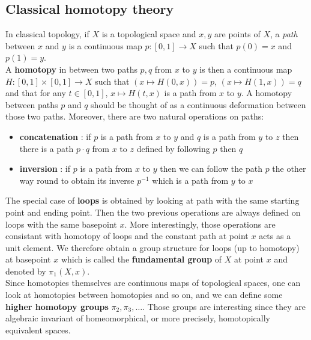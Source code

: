 \documentclass{report}
\begin{document}
\subsection{Classical homotopy theory}
In classical topology, if $X$ is a topological space and $x,y$ are points of $X$, a \textit{path} between $x$ and $y$ is a continuous map $p : [0,1] \rightarrow X$ such that $p(0)=x$ and $p(1)=y$.\\
A \textbf{homotopy} in between two paths $p,q$ from $x$ to $y$ is then a continuous map $H : [0,1] \times [0,1] \rightarrow X$ such that $(x \mapsto H(0,x) )= p$, $(x \mapsto H(1,x)) = q$ and that for any $t \in [0,1]$, $x\mapsto H(t,x)$ is a path from $x$ to $y$. A homotopy between paths $p$ and $q$ should be thought of as a continuous deformation between those two paths. Moreover, there are two natural operations on paths:
\begin{itemize}
    \item \textbf{concatenation} : if $p$ is a path from $x$ to $y$ and $q$ is a path from $y$ to $z$ then there is a path $p \cdot q$ from $x$ to $z$ defined by following $p$ then $q$
    \item \textbf{inversion} : if $p$ is a path from $x$ to $y$ then we can follow the path $p$ the other way round to obtain its inverse $p^{-1}$ which is a path from $y$ to $x$
\end{itemize}
The special case of \textbf{loops} is obtained by looking at path with the same starting point and ending point. Then the two previous operations are always defined on loops with the same basepoint $x$. More interestingly, those operations are consistant with homotopy of loops and the constant path at point $x$ acts as a unit element.
We therefore obtain a group structure for loops (up to homotopy) at basepoint $x$ which is called the \textbf{fundamental group} of $X$ at point $x$ and denoted by $\pi_1(X,x)$.\\
Since homotopies themselves are continuous maps of topological spaces, one can look at homotopies between homotopies and so on, and we can define some \textbf{higher homotopy groups} $\pi_2,\pi_3,\ldots$. Those groups are interesting since they are algebraic invariant of homeomorphical, or more precisely, homotopically equivalent spaces.
\end{document}
